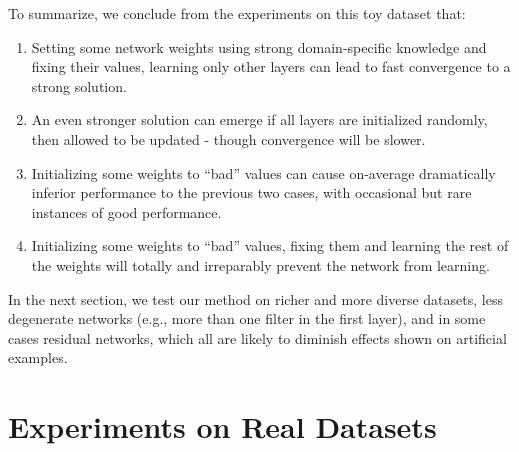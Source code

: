 \documentclass[10pt,journal,compsoc]{IEEEtran}
\begin{document}
To summarize, we conclude from the experiments on this toy dataset
that:
\begin{enumerate}
\item Setting some network weights using strong domain-specific knowledge
and fixing their values, learning only other layers can lead to fast
convergence to a strong solution.
\item An even stronger solution can emerge if all layers are initialized
randomly, then allowed to be updated - though convergence will be
slower. 
\item Initializing some weights to ``bad'' values can cause on-average
dramatically inferior performance to the previous two cases, with
occasional but rare instances of good performance.
\item Initializing some weights to ``bad'' values, fixing them and learning
the rest of the weights will totally and irreparably prevent the network
from learning.
\end{enumerate}
In the next section, we test our method on richer and more diverse
datasets, less degenerate networks (e.g., more than one filter in
the first layer), and in some cases residual networks, which all are
likely to diminish effects shown on artificial examples. 

\section{Experiments on Real Datasets\label{sec:Experiments}}
\begin{center}
\begin{figure*}
\begin{centering}
\par\end{centering}
\caption{\label{fig:Controller-initialization-scheme} (\emph{a}) Controller
initialization schemes. Mean loss averaged over 5 experiments for
different ways of initializing controller modules, overlaid with minimal
and maximal values. Random initialization performs the worst (\textcolor{red}{random}).
Approximating the behavior of a fine-tuned network is slightly better
(\textcolor{green}{linear\_approx}) and initializing by mimicking
the base network (\textcolor{blue}{diagonal}) performs the best (\emph{b})
Predictability of a control network's overall accuracy average over
all datasets, given its transferability measure. }
\end{figure*}
\par\end{center}
\end{document}
